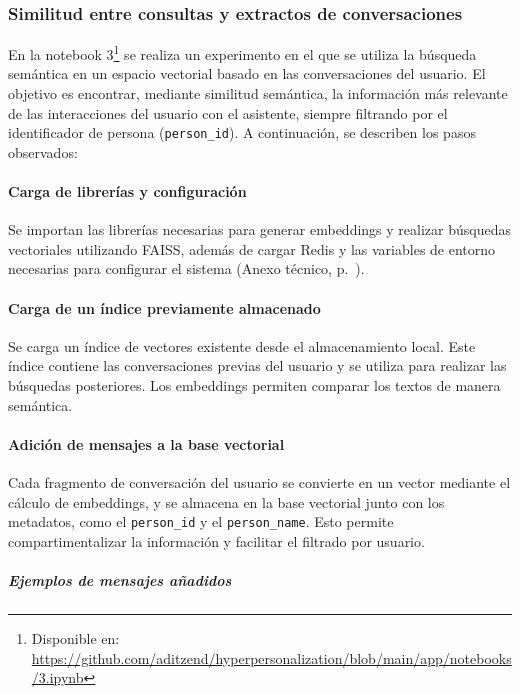 \subsubsection{Similitud entre consultas y extractos de conversaciones}

En la notebook 3\footnote{Disponible en: \url{https://github.com/aditzend/hyperpersonalization/blob/main/app/notebooks/3.ipynb}} se realiza un experimento en el que se utiliza la búsqueda semántica en un espacio vectorial basado en las conversaciones del usuario. El objetivo es encontrar, mediante similitud semántica, la información más relevante de las interacciones del usuario con el asistente, siempre filtrando por el identificador de persona (\texttt{person\_id}). A continuación, se describen los pasos observados:

\paragraph{Carga de librerías y configuración}

Se importan las librerías necesarias para generar embeddings y realizar búsquedas vectoriales utilizando FAISS, además de cargar Redis y las variables de entorno necesarias para configurar el sistema (Anexo técnico, p.~\pageref{anexo:code-4-1-3-1}).

\paragraph{Carga de un índice previamente almacenado}

Se carga un índice de vectores existente desde el almacenamiento local. Este índice contiene las conversaciones previas del usuario y se utiliza para realizar las búsquedas posteriores. Los embeddings permiten comparar los textos de manera semántica.

\paragraph{Adición de mensajes a la base vectorial}

Cada fragmento de conversación del usuario se convierte en un vector mediante el cálculo de embeddings, y se almacena en la base vectorial junto con los metadatos, como el \texttt{person\_id} y el \texttt{person\_name}. Esto permite compartimentalizar la información y facilitar el filtrado por usuario.

\subparagraph{Ejemplos de mensajes añadidos}

